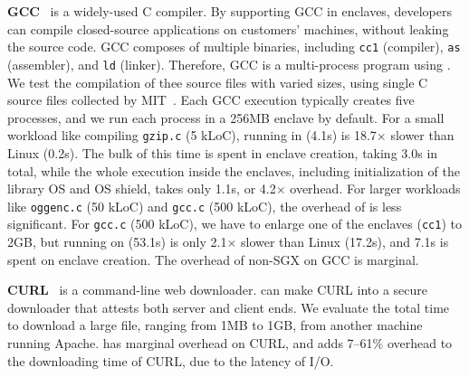 {\bf GCC}~\cite{gcc} is a widely-used C compiler.
By supporting GCC in enclaves, developers can compile closed-source applications on customers' machines,
without leaking the source code.
GCC composes of multiple binaries, including {\tt cc1} (compiler), {\tt as} (assembler), and {\tt ld} (linker).
Therefore, GCC is a multi-process program using .
We test the compilation of thee source files with varied sizes,
using single C source files collected by MIT~\cite{gcc-benchmark}.
Each GCC execution typically  creates five processes, and we run each process in a 256MB enclave by default.
For a small workload like compiling {\tt gzip.c} (5 kLoC), running in \graphenesgx{} (4.1s) is 18.7$\times$ slower than Linux (0.2s).
The bulk of this time is spent in enclave creation, taking 3.0s in total, while the whole execution inside the enclaves, including initialization of the library OS and OS shield, takes only 1.1s, or 4.2$\times$ overhead.
For larger workloads like {\tt oggenc.c} (50 kLoC) and {\tt gcc.c} (500 kLoC), 
the overhead of \graphenesgx{} is less significant. %
For {\tt gcc.c} (500 kLoC), we have to enlarge one of the enclaves ({\tt cc1}) to 2GB,
but running on \graphenesgx{} (53.1s) is only 2.1$\times$ slower than Linux (17.2s),
and 7.1s is spent on enclave creation.
The overhead of non-SGX \graphene{} on GCC is marginal.




{\bf CURL}~\cite{curl} is a command-line  web downloader.
\graphenesgx{} can make CURL into a secure downloader that attests both server and client ends.
We evaluate the total time to download a large file, ranging from 1MB to 1GB, from another machine running Apache. %
\graphene{} has marginal overhead on CURL, and
\graphenesgx{} adds 7--61\% overhead to the downloading time of CURL, due to the latency of I/O.


\makeatletter
{}
\makeatother
\graphicspath{{eval/figures/}}

